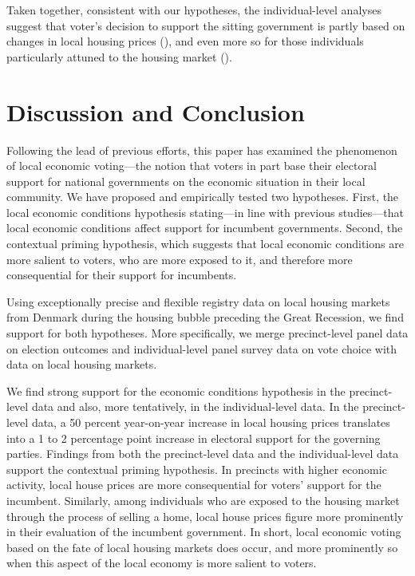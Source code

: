 \documentclass[12pt,a4paper]{article}
\begin{document}
	Taken together, consistent with our hypotheses, the individual-level analyses suggest that voter’s decision to support the sitting government is partly based on changes in local housing prices (\hone), and even more so for those individuals particularly attuned to the housing market (\htwo). 
	
	\section{Discussion and Conclusion}
	Following  the lead of previous efforts, this paper  has examined the phenomenon of local economic voting—the notion that voters in part base their electoral support for national governments on the economic situation in their local community. We have proposed and empirically tested two hypotheses. First, the local economic conditions hypothesis stating—in line with previous studies—that local economic conditions affect support for incumbent governments. Second, the contextual priming hypothesis, which suggests that local economic conditions are more salient to voters, who are more exposed to it, and therefore more consequential for their support for incumbents. 
	
	Using exceptionally precise and flexible registry data on local housing markets from Denmark during the housing bubble preceding  the Great Recession, we find support for both hypotheses. More specifically, we merge precinct-level panel data on election outcomes and individual-level panel survey data on vote choice with data on local housing markets.
	
	We find strong support for the economic conditions hypothesis in the precinct-level data and also, more tentatively, in the individual-level data. In the precinct-level data, a 50 percent year-on-year increase in local housing prices translates into a 1 to 2 percentage point increase in electoral support for the governing parties. Findings from both the precinct-level data and the individual-level data support the contextual priming hypothesis. In precincts with higher economic activity, local house prices are more consequential for voters’ support for the incumbent. Similarly, among individuals who are exposed to the housing market through the process of selling a home, local house prices figure more prominently in their evaluation of the incumbent government. In short, local economic voting based on the fate of local housing markets does occur, and more prominently so when this aspect of the local economy is more salient to voters.
	
\end{document}
